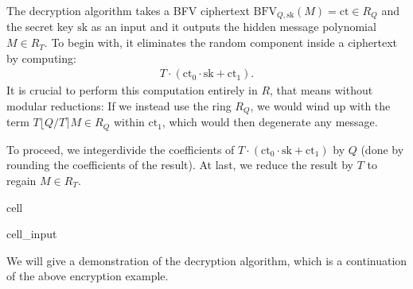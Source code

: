 \documentclass[letterpaper,10pt,english]{jupyterBook}
\begin{document}
\begin{DUlineblock}{0em}
\item[] 
\end{DUlineblock}

\sphinxAtStartPar
The decryption algorithm takes a BFV ciphertext \(\mathrm{BFV}_{Q,\mathrm{sk}}(M) = \mathrm{ct} \in R_Q\) and the secret key \(\mathrm{sk}\) as an input and it outputs the hidden message polynomial \(M \in R_T\).
To begin with, it eliminates the random component inside a ciphertext by computing:
\begin{equation*}
\begin{split}T\cdot (\mathrm{ct}_0 \cdot \mathrm{sk} + \mathrm{ct}_1).\end{split}
\end{equation*}
\sphinxAtStartPar
It is crucial to perform this computation entirely in \(R\), that means without modular reductions:
If we instead use the ring \(R_Q\), we would wind up with the term \(T \lfloor Q/T \rceil M \in R_Q\) within \(\mathrm{ct}_1\), which would then degenerate any message.

\sphinxAtStartPar
To proceed, we integer\sphinxhyphen{}divide the coefficients of \(T \cdot (\mathrm{ct}_0 \cdot \mathrm{sk} + \mathrm{ct}_1)\) by \(Q\) (done by rounding the coefficients of the result).
At last, we reduce the result by \(T\) to regain \(M \in R_T\).

\begin{sphinxuseclass}{cell}\begin{sphinxVerbatimInput}

\begin{sphinxuseclass}{cell_input}
\begin{sphinxVerbatim}[commandchars=\\\{\}]
    
            
     \PYG{p}{[}\PYG{p}{]} \PYG{p}{[}\PYG{p}{]} 
\end{sphinxVerbatim}

\end{sphinxuseclass}\end{sphinxVerbatimInput}

\end{sphinxuseclass}
\sphinxAtStartPar
We will give a demonstration of the decryption algorithm, which is a continuation of the above encryption example.
\end{document}
